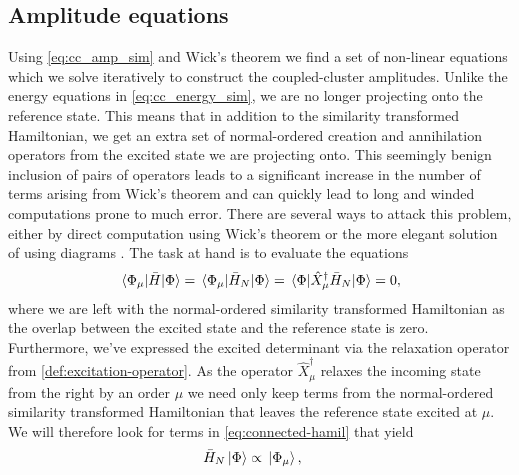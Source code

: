         \subsection{Amplitude equations}
            Using \autoref{eq:cc_amp_sim} and Wick's theorem we find a set of
            non-linear equations which we solve iteratively to construct the
            coupled-cluster amplitudes.
            Unlike the energy equations in \autoref{eq:cc_energy_sim}, we are no
            longer projecting onto the reference state.
            This means that in addition to the similarity transformed
            Hamiltonian, we get an extra set of normal-ordered creation and
            annihilation operators from the excited state we are projecting
            onto.
            This seemingly benign inclusion of pairs of operators leads to a
            significant increase in the number of terms arising from Wick's
            theorem and can quickly lead to long and winded computations prone
            to much error.
            There are several ways to attack this problem, either by direct
            computation using Wick's theorem \cite{crawford2000introduction} or
            the more elegant solution of using diagrams
            \cite{crawford2000introduction, shavitt2009many}.
            The task at hand is to evaluate the equations
            \begin{align}
                \mel*{\Phi_{\mu}}{\bar{H}}{\Phi}
                = \mel*{\Phi_{\mu}}{\bar{H}_N}{\Phi}
                = \mel*{\Phi}{
                    \hat{X}^{\dagger}_{\mu}\bar{H}_N
                }{\Phi}
                = 0,
            \end{align}
            where we are left with the normal-ordered similarity transformed
            Hamiltonian as the overlap between the excited state and the
            reference state is zero.
            Furthermore, we've expressed the excited determinant via the
            relaxation operator from \autoref{def:excitation-operator}.
            As the operator $\hat{X}^{\dagger}_{\mu}$ relaxes the incoming state
            from the right by an order $\mu$ we need only keep terms from the
            normal-ordered similarity transformed Hamiltonian that leaves the
            reference state excited at $\mu$.
            We will therefore look for terms in \autoref{eq:connected-hamil}
            that yield
            \begin{align}
                \bar{H}_N\ket*{\Phi}
                &\propto \ket*{\Phi_{\mu}},
            \end{align}
